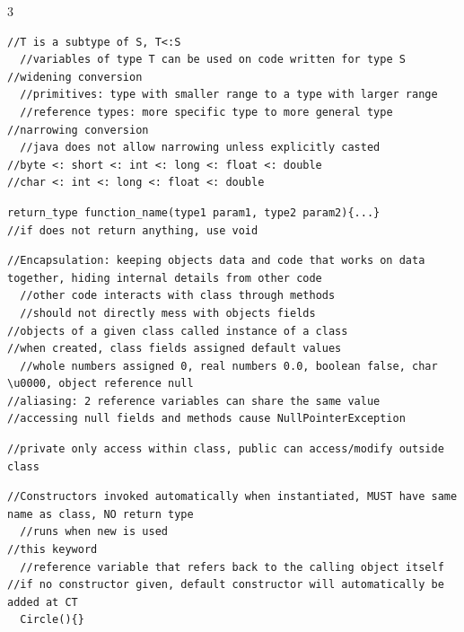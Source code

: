 \documentclass[10pt,a4paper]{article}
\begin{document}
\footnotesize

\begin{multicols*}{3}
\raggedcolumns

\begin{verbatim}
//T is a subtype of S, T<:S
  //variables of type T can be used on code written for type S
//widening conversion
  //primitives: type with smaller range to a type with larger range
  //reference types: more specific type to more general type
//narrowing conversion
  //java does not allow narrowing unless explicitly casted
//byte <: short <: int <: long <: float <: double
//char <: int <: long <: float <: double
\end{verbatim}
\begin{verbatim}
return_type function_name(type1 param1, type2 param2){...}
//if does not return anything, use void
\end{verbatim}
\begin{verbatim}
//Encapsulation: keeping objects data and code that works on data together, hiding internal details from other code
  //other code interacts with class through methods
  //should not directly mess with objects fields
//objects of a given class called instance of a class
//when created, class fields assigned default values
  //whole numbers assigned 0, real numbers 0.0, boolean false, char \u0000, object reference null
//aliasing: 2 reference variables can share the same value
//accessing null fields and methods cause NullPointerException
\end{verbatim}
\begin{verbatim}
//private only access within class, public can access/modify outside class
\end{verbatim}
\begin{verbatim}
//Constructors invoked automatically when instantiated, MUST have same name as class, NO return type
  //runs when new is used
//this keyword
  //reference variable that refers back to the calling object itself
//if no constructor given, default constructor will automatically be added at CT
  Circle(){}
\end{verbatim}
\begin{verbatim}

\end{verbatim}
\end{multicols*}
\end{document}

